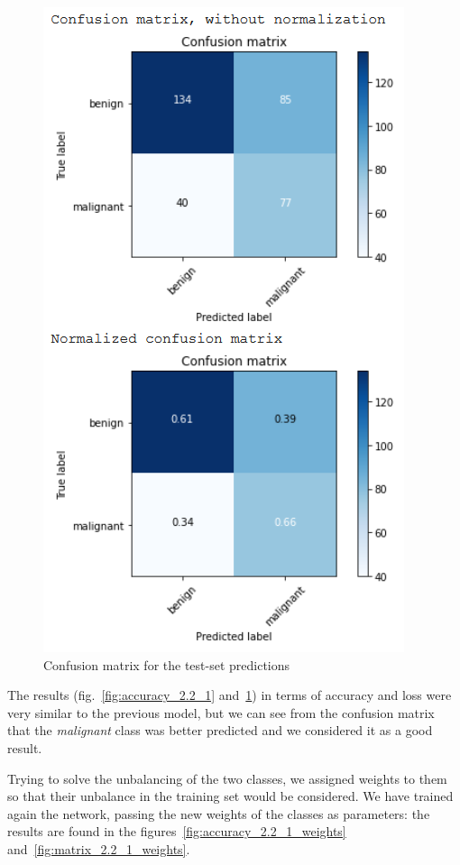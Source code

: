 \documentclass[11pt,a4paper,oneside]{article}
\begin{document}
\begin{figure}[h]
\begin{minipage}[c]{.4\textwidth}
		\includegraphics[width=.9\textwidth]{images/2.2/5_matrix}
		\caption{Confusion matrix for the test-set predictions}
		\label{fig:matrix_2.2_1}
	\end{minipage}%
\end{figure}

The results (fig.~\ref{fig:accuracy_2.2_1} and~\ref{fig:matrix_2.2_1}) in terms of accuracy and loss were very similar to the previous model, but we can see from the confusion matrix that the \textit{malignant} class was better predicted and we considered it as a good result.

Trying to solve the unbalancing of the two classes, we assigned weights to them so that their unbalance in the training set would be considered. We have trained again the network, passing the new weights of the classes as parameters: the results are found in the figures~\ref{fig:accuracy_2.2_1_weights} and~\ref{fig:matrix_2.2_1_weights}. 
\end{document}
